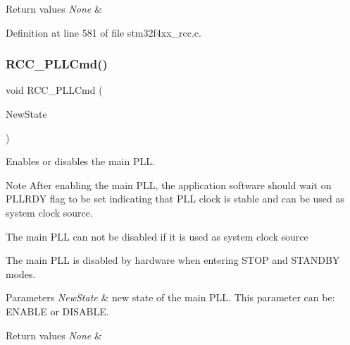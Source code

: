 \begin{DoxyRetVals}{Return values}
{\em None} & \\
\hline
\end{DoxyRetVals}


Definition at line 581 of file stm32f4xx\+\_\+rcc.\+c.

\mbox{\label{group___r_c_c___group1_ga84dee53c75e58fdb53571716593c2272}} 
\subsubsection{\texorpdfstring{R\+C\+C\+\_\+\+P\+L\+L\+Cmd()}{RCC\_PLLCmd()}}
{\footnotesize\ttfamily void R\+C\+C\+\_\+\+P\+L\+L\+Cmd (\begin{DoxyParamCaption}\item[{Functional\+State}]{New\+State }\end{DoxyParamCaption})}



Enables or disables the main P\+LL. 

\begin{DoxyNote}{Note}
After enabling the main P\+LL, the application software should wait on P\+L\+L\+R\+DY flag to be set indicating that P\+LL clock is stable and can be used as system clock source. 

The main P\+LL can not be disabled if it is used as system clock source 

The main P\+LL is disabled by hardware when entering S\+T\+OP and S\+T\+A\+N\+D\+BY modes. 
\end{DoxyNote}

\begin{DoxyParams}{Parameters}
{\em New\+State} & new state of the main P\+LL. This parameter can be\+: E\+N\+A\+B\+LE or D\+I\+S\+A\+B\+LE. \\
\hline
\end{DoxyParams}

\begin{DoxyRetVals}{Return values}
{\em None} & \\
\hline
\end{DoxyRetVals}


